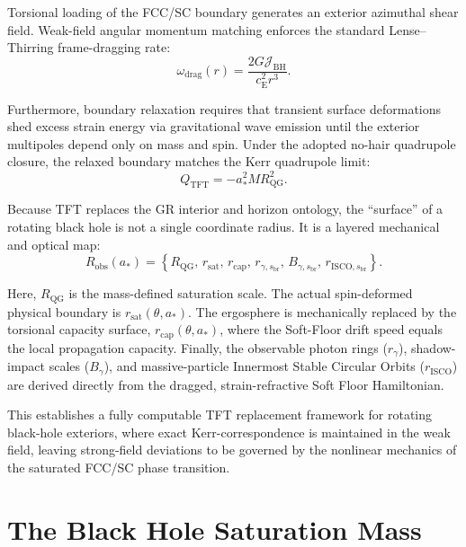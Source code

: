 Torsional loading of the FCC/SC boundary generates an exterior azimuthal shear field. Weak-field angular momentum matching enforces the standard Lense--Thirring frame-dragging rate:
\begin{equation}
    \omega_{\mathrm{drag}}(r) = \frac{2G\mathcal{J}_{\mathrm{BH}}}{c_{\mathrm{E}}^2 r^3}.
\end{equation}

Furthermore, boundary relaxation requires that transient surface deformations shed excess strain energy via gravitational wave emission until the exterior multipoles depend only on mass and spin. Under the adopted no-hair quadrupole closure, the relaxed boundary matches the Kerr quadrupole limit:
\begin{equation}
    Q_{\mathrm{TFT}} = -a_\ast^2 M R_{\mathrm{QG}}^2.
\end{equation}

Because TFT replaces the GR interior and horizon ontology, the “surface” of a rotating black hole is not a single coordinate radius. It is a layered mechanical and optical map:
\begin{equation}
    R_{\mathrm{obs}}(a_\ast) = \left\{ R_{\mathrm{QG}}, \, r_{\mathrm{sat}}, \, r_{\mathrm{cap}}, \, r_{\gamma,s_{\mathrm{br}}}, \, B_{\gamma,s_{\mathrm{br}}}, \, r_{\mathrm{ISCO},s_{\mathrm{br}}} \right\}.
\end{equation}

Here, $R_{\mathrm{QG}}$ is the mass-defined saturation scale. The actual spin-deformed physical boundary is $r_{\mathrm{sat}}(\theta, a_\ast)$. The ergosphere is mechanically replaced by the torsional capacity surface, $r_{\mathrm{cap}}(\theta, a_\ast)$, where the Soft-Floor drift speed equals the local propagation capacity. Finally, the observable photon rings ($r_{\gamma}$), shadow-impact scales ($B_{\gamma}$), and massive-particle Innermost Stable Circular Orbits ($r_{\mathrm{ISCO}}$) are derived directly from the dragged, strain-refractive Soft Floor Hamiltonian. 

This establishes a fully computable TFT replacement framework for rotating black-hole exteriors, where exact Kerr-correspondence is maintained in the weak field, leaving strong-field deviations to be governed by the nonlinear mechanics of the saturated FCC/SC phase transition.

\section{The Black Hole Saturation Mass}

